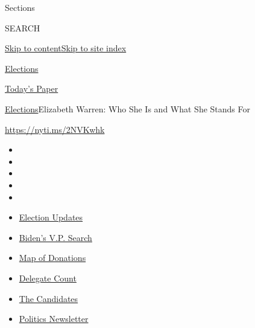 Sections

SEARCH

\protect\hyperlink{site-content}{Skip to
content}\protect\hyperlink{site-index}{Skip to site index}

\href{https://www.nytimes.com/news-event/2020-election}{Elections}

\href{https://myaccount.nytimes.com/auth/login?response_type=cookie\&client_id=vi}{}

\href{https://www.nytimes.com/section/todayspaper}{Today's Paper}

\href{/news-event/2020-election}{Elections}\textbar{}Elizabeth Warren:
Who She Is and What She Stands For

\url{https://nyti.ms/2NVKwhk}

\begin{itemize}
\item
\item
\item
\item
\item
\end{itemize}

\begin{itemize}
\item
  \href{https://www.nytimes.com/2020/07/31/us/elections/biden-vs-trump.html?action=click\&pgtype=Article\&state=default\&region=TOP_BANNER\&context=storylines_menu}{Election
  Updates}
\item
  \href{https://www.nytimes.com/article/biden-vice-president-2020.html?action=click\&pgtype=Article\&state=default\&region=TOP_BANNER\&context=storylines_menu}{Biden's
  V.P. Search}
\item
  \href{https://www.nytimes.com/interactive/2020/07/24/us/politics/trump-biden-campaign-donors.html?action=click\&pgtype=Article\&state=default\&region=TOP_BANNER\&context=storylines_menu}{Map
  of Donations}
\item
  \href{https://www.nytimes.com/interactive/2020/us/elections/delegate-count-primary-results.html?action=click\&pgtype=Article\&state=default\&region=TOP_BANNER\&context=storylines_menu}{Delegate
  Count}
\item
  \href{https://www.nytimes.com/interactive/2019/us/politics/2020-presidential-candidates.html?action=click\&pgtype=Article\&state=default\&region=TOP_BANNER\&context=storylines_menu}{The
  Candidates}
\item
  \href{https://www.nytimes.com/newsletters/politics?action=click\&pgtype=Article\&state=default\&region=TOP_BANNER\&context=storylines_menu}{Politics
  Newsletter}
\end{itemize}

